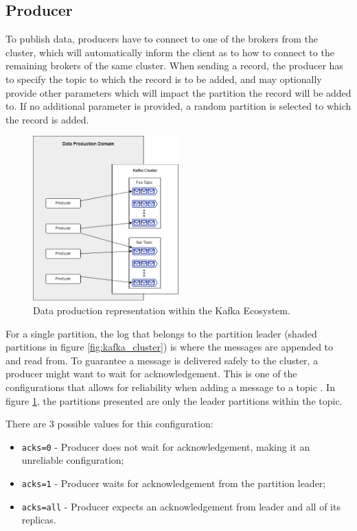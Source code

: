 \subsection{Producer}

To publish data, producers have to connect to one of the brokers from the
cluster, which will automatically inform the client as to how to connect to the
remaining brokers of the same cluster. When sending a record, the producer
has to specify the topic to which the record is to be added, and may optionally
provide other parameters which will impact the partition the record will be
added to. If no additional parameter is provided, a random partition is selected
to which the record is added.

\begin{figure}[hbt!] 
    \centering
    \includegraphics[width=0.5\textwidth]{images/infrastructure/Production Domain.png}
    \caption{
        Data production representation within the Kafka Ecosystem.
    } 
    \label{fig:data_production_domain} 
\end{figure}

For a single partition, the log that belongs to the partition leader (shaded
partitions in figure \ref{fig:kafka_cluster}) is where the messages are appended
to and read from. To guarantee a message is delivered safely to the cluster, a
producer might want to wait for acknowledgement. This is one of the
configurations that allows for reliability when adding a message to a topic
\cite{KafkaProducer}. In figure \ref{fig:data_production_domain}, the partitions
presented are only the leader partitions within the topic.

There are 3 possible values for this configuration:
\begin{itemize}
    \item \lstinline{acks=0} - Producer does not wait for acknowledgement, making it an
        unreliable configuration;
    \item \lstinline{acks=1} - Producer waits for acknowledgement from the partition
        leader;
    \item \lstinline{acks=all} - Producer expects an acknowledgement from leader and all
        of its replicas.
\end{itemize}

